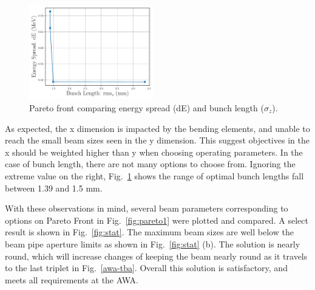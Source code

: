  
\begin{figure}
	\centering
	\includegraphics[width=0.48\textwidth]{../pareto_stat_plots/dE_vs_zrms_pareto_front_quads_before_Q5_zoomout}%
	\caption{Pareto front comparing energy spread (dE) and bunch length ($\sigma_z$). }
	\label{fig:pareto2}
\end{figure}  


As expected, the x dimension is impacted by the bending elements, and unable to reach 
the small beam sizes seen in the y dimension. This suggest objectives in the x 
should be weighted higher than y when choosing operating parameters. 
In the case of bunch length, there are not many options to choose from.
Ignoring the extreme value on the right, Fig.~\ref{fig:pareto2} shows the 
range of optimal bunch lengths fall between 1.39 and 1.5 mm.

With these observations in mind, several beam parameters corresponding to
options on Pareto Front in Fig.~\ref{fig:pareto1} were plotted and compared. 
A select result is shown in Fig.~\ref{fig:stat}. 
The maximum beam sizes are well below the beam pipe aperture limits as shown in Fig.~\ref{fig:stat} (b).
The solution is nearly round, which will increase changes of keeping the beam nearly round
as it travels to the last triplet in Fig.~\ref{awa-tba}.
Overall this solution is satisfactory, and meets all requirements at the AWA.


